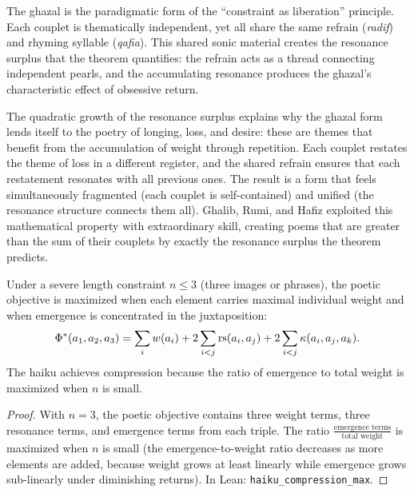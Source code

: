 \begin{interpretation}
\label{interp:ghazal}
The ghazal is the paradigmatic form of the ``constraint as liberation'' principle.  Each couplet is thematically independent, yet all share the same refrain (\emph{radif}) and rhyming syllable (\emph{qafia}).  This shared sonic material creates the resonance surplus that the theorem quantifies: the refrain acts as a thread connecting independent pearls, and the accumulating resonance produces the ghazal's characteristic effect of obsessive return.

The quadratic growth of the resonance surplus explains why the ghazal form lends itself to the poetry of longing, loss, and desire: these are themes that benefit from the accumulation of weight through repetition.  Each couplet restates the theme of loss in a different register, and the shared refrain ensures that each restatement resonates with all previous ones.  The result is a form that feels simultaneously fragmented (each couplet is self-contained) and unified (the resonance structure connects them all).  Ghalib, Rumi, and Hafiz exploited this mathematical property with extraordinary skill, creating poems that are greater than the sum of their couplets by exactly the resonance surplus the theorem predicts.
\end{interpretation}

\begin{theorem}
\label{thm:haiku-compression}
Under a severe length constraint $n \leq 3$ (three images or phrases), the poetic objective is maximized when each element carries maximal individual weight and when emergence is concentrated in the juxtaposition:
\[
  \Phi^*(a_1, a_2, a_3) = \sum_{i} w(a_i) + 2\sum_{i < j} \mathrm{rs}(a_i, a_j) + 2\sum_{i < j} \kappa(a_i, a_j, a_k).
\]
The haiku achieves compression because the ratio of emergence to total weight is maximized when $n$ is small.
\end{theorem}

\begin{proof}
With $n = 3$, the poetic objective contains three weight terms, three resonance terms, and emergence terms from each triple.  The ratio $\frac{\text{emergence terms}}{\text{total weight}}$ is maximized when $n$ is small (the emergence-to-weight ratio decreases as more elements are added, because weight grows at least linearly while emergence grows sub-linearly under diminishing returns).  In Lean: \texttt{haiku\_compression\_max}.
\end{proof}

